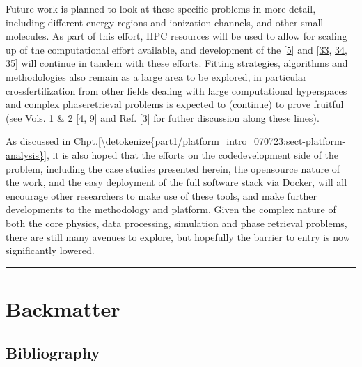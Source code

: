 \documentclass[letterpaper,table,10pt,english]{jupyterBook}
\begin{document}
\sphinxAtStartPar
Future work is planned to look at these specific problems in more detail, including different energy regions and ionization channels, and other small molecules. As part of this effort, HPC resources will be used to allow for scaling up of the computational effort available, and development of the  {[}\hyperlink{cite.backmatter/bibliography:id682}{5}{]} and  {[}\hyperlink{cite.backmatter/bibliography:id666}{33}, \hyperlink{cite.backmatter/bibliography:id608}{34}, \hyperlink{cite.backmatter/bibliography:id606}{35}{]} will continue in tandem with these efforts. Fitting strategies, algorithms and methodologies also remain as a large area to be explored, in particular cross\sphinxhyphen{}fertilization from other fields dealing with large computational hyperspaces and complex phase\sphinxhyphen{}retrieval problems is expected to (continue) to prove fruitful (see  Vols. 1 \& 2 {[}\hyperlink{cite.backmatter/bibliography:id677}{4}, \hyperlink{cite.backmatter/bibliography:id678}{9}{]} and Ref. {[}\hyperlink{cite.backmatter/bibliography:id686}{3}{]} for futher discussion along these lines).

\sphinxAtStartPar
As discussed in \hyperref[\detokenize{part1/platform_intro_070723:sect-platform-analysis}]{Chpt.\@ \ref{\detokenize{part1/platform_intro_070723:sect-platform-analysis}}}, it is also hoped that the efforts on the code\sphinxhyphen{}development side of the problem, including the case studies presented herein, the open\sphinxhyphen{}source nature of the work, and the easy deployment of the full software stack via Docker, will all encourage other researchers to make use of these tools, and make further developments to the methodology and platform. Given the complex nature of both the core physics, data processing, simulation and phase retrieval problems, there are still many avenues to explore, but hopefully the barrier to entry is now significantly lowered.


\bigskip\hrule\bigskip


\sphinxstepscope


\part{Backmatter}

\sphinxstepscope


\chapter{Bibliography}
\label{\detokenize{backmatter/bibliography:bibliography}}\label{\detokenize{backmatter/bibliography::doc}}\label{\detokenize{backmatter/bibliography:id1}}
\sphinxstepscope
\end{document}
